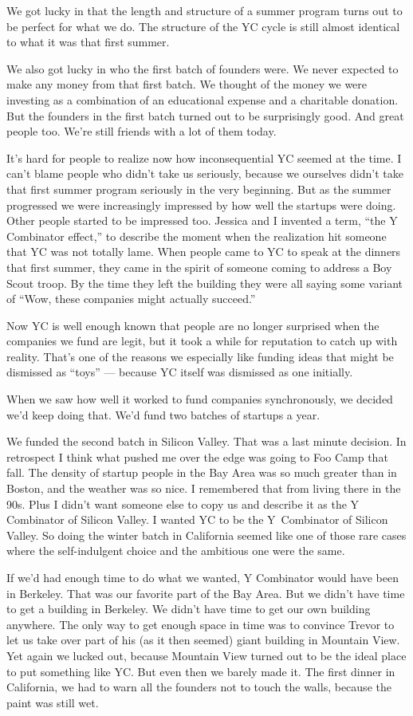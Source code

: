 We got lucky in that the length and structure of a summer program turns
out to be perfect for what we do. The structure of the YC cycle is still
almost identical to what it was that first summer.

We also got lucky in who the first batch of founders were. We never
expected to make any money from that first batch. We thought of the
money we were investing as a combination of an educational expense and a
charitable donation. But the founders in the first batch turned out to
be surprisingly good. And great people too. We're still friends with a
lot of them today.

It's hard for people to realize now how inconsequential YC seemed at the
time. I can't blame people who didn't take us seriously, because we
ourselves didn't take that first summer program seriously in the very
beginning. But as the summer progressed we were increasingly impressed
by how well the startups were doing. Other people started to be
impressed too. Jessica and I invented a term, ``the Y Combinator
effect,'' to describe the moment when the realization hit someone that
YC was not totally lame. When people came to YC to speak at the dinners
that first summer, they came in the spirit of someone coming to address
a Boy Scout troop. By the time they left the building they were all
saying some variant of ``Wow, these companies might actually succeed.''

Now YC is well enough known that people are no longer surprised when the
companies we fund are legit, but it took a while for reputation to catch
up with reality. That's one of the reasons we especially like funding
ideas that might be dismissed as ``toys'' --- because YC itself was
dismissed as one initially.

When we saw how well it worked to fund companies synchronously, we
decided we'd keep doing that. We'd fund two batches of startups a year.

We funded the second batch in Silicon Valley. That was a last minute
decision. In retrospect I think what pushed me over the edge was going
to Foo Camp that fall. The density of startup people in the Bay Area was
so much greater than in Boston, and the weather was so nice. I
remembered that from living there in the 90s. Plus I didn't want someone
else to copy us and describe it as the Y Combinator of Silicon Valley. I
wanted YC to be the Y~Combinator of Silicon Valley. So doing the winter
batch in California seemed like one of those rare cases where the
self-indulgent choice and the ambitious one were the same.

If we'd had enough time to do what we wanted, Y Combinator would have
been in Berkeley. That was our favorite part of the Bay Area. But we
didn't have time to get a building in Berkeley. We didn't have time to
get our own building anywhere. The only way to get enough space in time
was to convince Trevor to let us take over part of his (as it then
seemed) giant building in Mountain View. Yet again we lucked out,
because Mountain View turned out to be the ideal place to put something
like YC. But even then we barely made it. The first dinner in
California, we had to warn all the founders not to touch the walls,
because the paint was still wet.